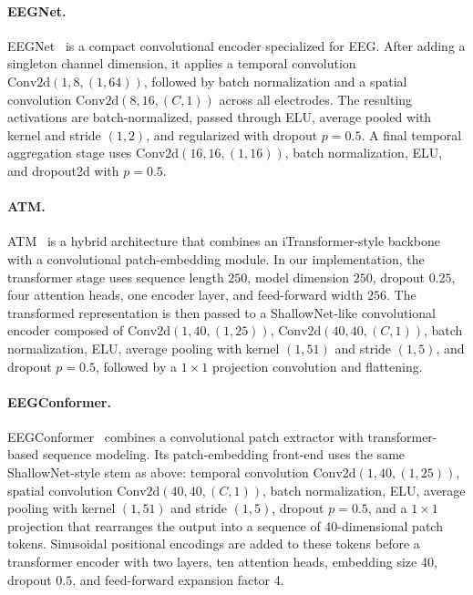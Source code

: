 \documentclass{article}
\begin{document}
\paragraph{EEGNet.}
EEGNet~\cite{lawhern2018eegnet} is a compact convolutional encoder specialized for EEG. After adding a singleton channel dimension, it applies a temporal convolution $\mathrm{Conv2d}(1, 8, (1, 64))$, followed by batch normalization and a spatial convolution $\mathrm{Conv2d}(8, 16, (C, 1))$ across all electrodes. The resulting activations are batch-normalized, passed through ELU, average pooled with kernel and stride $(1, 2)$, and regularized with dropout $p=0.5$. A final temporal aggregation stage uses $\mathrm{Conv2d}(16, 16, (1, 16))$, batch normalization, ELU, and dropout2d with $p=0.5$. 

\paragraph{ATM.}
ATM~\cite{li2024atm} is a hybrid architecture that combines an iTransformer-style backbone with a convolutional patch-embedding module. In our implementation, the transformer stage uses sequence length $250$, model dimension $250$, dropout $0.25$, four attention heads, one encoder layer, and feed-forward width $256$. The transformed representation is then passed to a ShallowNet-like convolutional encoder composed of $\mathrm{Conv2d}(1, 40, (1, 25))$, $\mathrm{Conv2d}(40, 40, (C, 1))$, batch normalization, ELU, average pooling with kernel $(1, 51)$ and stride $(1, 5)$, and dropout $p=0.5$, followed by a $1 \times 1$ projection convolution and flattening. 

\paragraph{EEGConformer.}
EEGConformer~\cite{song2023eegconformer} combines a convolutional patch extractor with transformer-based sequence modeling. Its patch-embedding front-end uses the same ShallowNet-style stem as above: temporal convolution $\mathrm{Conv2d}(1, 40, (1, 25))$, spatial convolution $\mathrm{Conv2d}(40, 40, (C, 1))$, batch normalization, ELU, average pooling with kernel $(1, 51)$ and stride $(1, 5)$, dropout $p=0.5$, and a $1 \times 1$ projection that rearranges the output into a sequence of 40-dimensional patch tokens. Sinusoidal positional encodings are added to these tokens before a transformer encoder with two layers, ten attention heads, embedding size 40, dropout $0.5$, and feed-forward expansion factor 4. 
\end{document}
